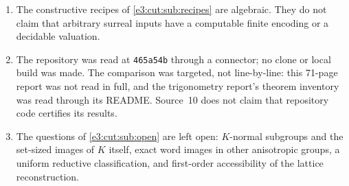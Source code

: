 \documentclass[11pt,letterpaper]{article}
\numberwithin{equation}{section}
\theoremstyle{definition}
\theoremstyle{remark}
\begin{document}
\begin{enumerate}[label=\textup{C\arabic*.},leftmargin=2.6em]
 higher-rank commutator width one at prescribed depths.
\item The constructive recipes of \cref{e3:cut:sub:recipes} are algebraic. They
 do not claim that arbitrary surreal inputs have a computable finite encoding or
 a decidable valuation.
\item The repository was read at \texttt{465a54b} through a connector; no clone
 or local build was made. The comparison was targeted, not line-by-line: this
 71-page report was not read in full, and the trigonometry report's theorem
 inventory was read through its README. Source~10 does not claim that
 repository code certifies its results.
\item The questions of \cref{e3:cut:sub:open} are left open: $K$-normal
 subgroups and the set-sized images of $K$ itself, exact word images in other
 anisotropic groups, a uniform reductive classification, and first-order
 accessibility of the lattice reconstruction.
\end{enumerate}
\end{document}
